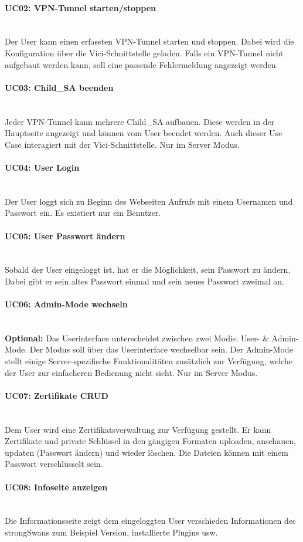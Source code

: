 \paragraph{UC02: VPN-Tunnel starten/stoppen}\mbox{} \\
Der User kann einen erfassten VPN-Tunnel starten und stoppen. Dabei wird die Konfiguration über die Vici-Schnittstelle geladen. Falls ein VPN-Tunnel nicht aufgebaut werden kann, soll eine passende Fehlermeldung angezeigt werden. 

\paragraph{UC03: Child\_SA beenden}\mbox{} \\
Jeder VPN-Tunnel kann mehrere Child\_SA aufbauen. Diese werden in der Hauptseite angezeigt und können vom User beendet werden. Auch dieser Use Case interagiert mit der Vici-Schnittstelle. Nur im Server Modus.

\paragraph{UC04: User Login}\mbox{} \\
Der User loggt sich zu Beginn des Webseiten Aufrufs mit einem Usernamen und Passwort ein. Es existiert nur ein Benutzer.

\paragraph{UC05: User Passwort ändern}\mbox{} \\
Sobald der User eingeloggt ist, hat er die Möglichkeit, sein Passwort zu ändern. Dabei gibt er sein altes Passwort einmal und sein neues Passwort zweimal an.

\paragraph{UC06: Admin-Mode wechseln}\mbox{} \\
\textbf{Optional:} Das Userinterface unterscheidet zwischen zwei Modis: User- \& Admin-Mode. Der Modus soll über das Userinterface wechselbar sein. Der Admin-Mode stellt einige Server-spezifische Funktionalitäten zusätzlich zur Verfügung, welche der User zur einfacheren Bedienung nicht sieht. Nur im Server Modus.

\paragraph{UC07: Zertifikate CRUD}\mbox{} \\
Dem User wird eine Zertifikatsverwaltung zur Verfügung gestellt. Er kann Zertifikate und private Schlüssel in den gängigen Formaten uploaden, anschauen, updaten (Passwort ändern) und wieder löschen. Die Dateien können mit einem Passwort verschlüsselt sein. 

\paragraph{UC08: Infoseite anzeigen}\mbox{} \\
Die Informationsseite zeigt dem eingeloggten User verschieden Informationen des strongSwans zum Beispiel Version, installierte Plugins usw.

\newpage




